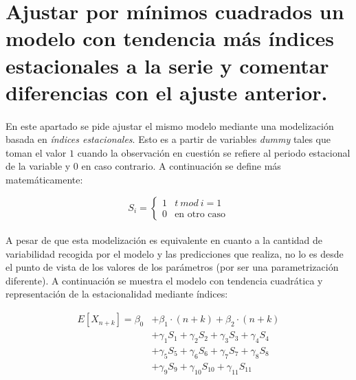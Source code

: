 \documentclass[a4paper, spanish]{article}
\begin{document}
  \section{Ajustar por mínimos cuadrados un modelo con tendencia más índices estacionales a la serie y comentar diferencias con el ajuste anterior.}

    \paragraph{}
    En este apartado se pide ajustar el mismo modelo mediante una modelización basada en \emph{índices estacionales}. Esto es a partir de variables \emph{dummy} tales que toman el valor $1$ cuando la observación en cuestión se refiere al periodo estacional de la variable y $0$ en caso contrario. A continuación se define más matemáticamente:

    \begin{equation*}
      S_i =
      \begin{cases}
        1 & t \ mod \ i = 1 \\
        0 & \text{en otro caso}
     \end{cases}
    \end{equation*}

    \paragraph{}
    A pesar de que esta modelización es equivalente en cuanto a la cantidad de variabilidad recogida por el modelo y las predicciones que realiza, no lo es desde el punto de vista de los valores de los parámetros (por ser una parametrización diferente). A continuación se muestra el modelo con tendencia cuadrática y representación de la estacionalidad mediante índices:

    \begin{align*}
      E[X_{n + k}] = \beta_0 &+ \beta_1 \cdot (n + k) + \beta_2 \cdot(n + k) \\
      &+ \gamma_{1} S_{1} + \gamma_{2} S_{2} + \gamma_{3} S_{3} + \gamma_{4} S_{4} \\
      &+ \gamma_{5} S_{5} + \gamma_{6} S_{6} + \gamma_{7} S_{7} + \gamma_{8} S_{8} \\
      &+ \gamma_{9} S_{9} + \gamma_{10} S_{10}  + \gamma_{11} S_{11}
    \end{align*}
\end{document}
